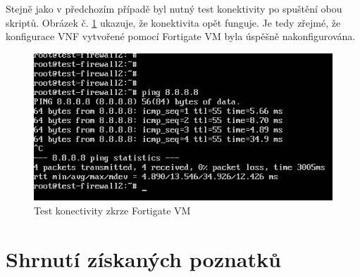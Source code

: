 Stejně jako v předchozím případě byl nutný test konektivity po spuštění obou skriptů. Obrázek č. \ref{fig:test_fortios} ukazuje, že konektivita opět funguje. Je tedy zřejmé, že konfigurace VNF vytvořené pomocí Fortigate VM byla úspěšně nakonfigurována.

\begin{figure}[h]
\begin{centering}
\includegraphics[scale=0.5]{images/test_fortios}
\par\end{centering}
\caption{Test konectivity zkrze Fortigate VM\label{fig:test_fortios}}
\end{figure}

\section{Shrnutí získaných poznatků}